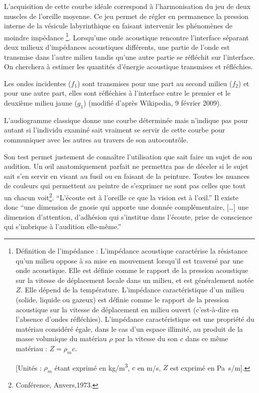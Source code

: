 L'acquisition de cette courbe idéale correspond à l'harmonisation
du jeu de deux muscles de l'oreille moyenne. Ce jeu
permet de régler en permanence la pression interne de la vésicule
labyrinthique en faisant intervenir les phénomènes de moindre impédance%
\footnote{Définition de l'impédance : L'impédance acoustique
caractérise la résistance qu'un milieu oppose à sa mise en mouvement
lorsqu'il est traversé par une onde acoustique. Elle est définie comme
le rapport de la pression acoustique sur la vitesse de déplacement
locale dans un milieu, et est généralement notée $Z$. Elle dépend de
la température. L'impédance caractéristique d'un milieu (solide, liquide
ou gazeux) est définie comme le rapport de la pression acoustique
sur la vitesse de déplacement en milieu ouvert (c'est-à-dire
en l'absence d'ondes réfléchies). L'impédance caractéristique est
une propriété du matériau considéré égale, dans le cas d'un espace
illimité, au produit de la masse volumique du matériau $\rho$
par la vitesse du son $c$ dans ce même matériau : $Z = \rho_{m} c$.

[Unités : $\rho_{m}$ étant exprimé en \si{kg/m\cubed},
 $c$ en \si{m/s}, $Z$ est
exprimé en \si{\pascal . s/m}].}. Lorsqu'une onde acoustique rencontre l'interface
séparant deux milieux d'impédances acoustiques différents, une partie
de l'onde est transmise dans l'autre milieu tandis qu'une autre partie
se réfléchit sur l'interface. On cherchera à estimer les quantités
d'énergie acoustique transmises et réfléchies.

Les ondes incidentes ($f_1$) sont transmises pour une part au second
milieu ($f_2$) et pour une autre part, elles sont réfléchies à l'interface
entre le premier et le deuxième milieu jaune ($g_1$) (modifié d'après
Wikipedia, 9 février 2009).

L'audiogramme classique donne une courbe déterminée
mais n'indique pas pour autant si l'individu examiné
sait vraiment se servir de cette courbe pour communiquer avec les
autres au travers de son autocontrôle.

Son test permet justement de connaître l'utilisation que sait faire
un sujet de son audition. Un \oe il anatomiquement parfait ne permettra
pas de déceler si le sujet sait s'en servir en visant au fusil ou
en faisant de la peinture. Toutes les nuances de couleurs qui permettent
au peintre de s'exprimer ne sont pas celles que tout un chacun voit\footnote{Conférence, Anvers,1973.}. %
\enquote{L'écoute est à l'oreille ce que la vision est à
l'\oe il.} %
 Il existe donc \enquote{une dimension de gnosie qui apporte une
donnée complémentaire, [\dots] une dimension d'attention, d'adhésion
qui s'institue dans l'écoute, prise de conscience qui s'imbrique
à l'audition elle-même.}
 

